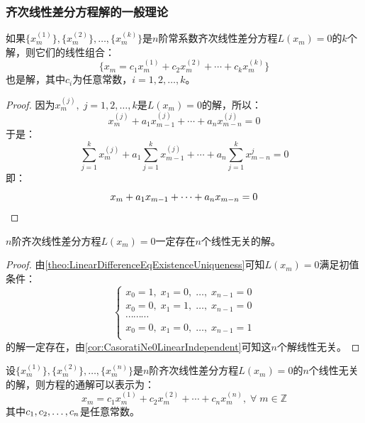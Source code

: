 \subsubsection{齐次线性差分方程解的一般理论}
\begin{theorem}\label{theo:LinearDifferenceLinearCombination}
	如果$\{x_m^{(1)}\},\{x_m^{(2)}\},\dots,\{x_m^{(k)}\}$是$n$阶常系数齐次线性差分方程$L(x_m)=0$的$k$个解，则它们的线性组合：
	\begin{equation*}
		\{x_m=c_1x_m^{(1)}+c_2x_m^{(2)}+\cdots+c_kx_m^{(k)}\}
	\end{equation*}
	也是解，其中$c_i$为任意常数，$i=1,2,\dots,k$。
\end{theorem}
\begin{proof}
	因为$x_m^{(j)},\;j=1,2,\dots,k$是$L(x_m)=0$的解，所以：
	\begin{equation*}
		x_m^{(j)}+a_{1}x_{m-1}^{(j)}+\cdots+a_nx_{m-n}^{(j)}=0
	\end{equation*}
	于是：
	\begin{equation*}
		\sum_{j=1}^{k}x_m^{(j)}+a_1\sum_{j=1}^{k}x_{m-1}^{(j)}+\cdots+a_n\sum_{j=1}^{k}x_{m-n}^{j}=0
	\end{equation*}
	即：
	\begin{equation*}
		x_m+a_{1}x_{m-1}+\cdots+a_nx_{m-n}=0\qedhere
	\end{equation*}
\end{proof}
\begin{theorem}
	$n$阶齐次线性差分方程$L(x_m)=0$一定存在$n$个线性无关的解。
\end{theorem}
\begin{proof}
	由\cref{theo:LinearDifferenceEqExistenceUniqueness}可知$L(x_m)=0$满足初值条件：
	\begin{equation*}
		\begin{cases}
			x_0=1,\;x_1=0,\;\dots,\;x_{n-1}=0 \\
			x_0=0,\;x_1=1,\;\dots,\;x_{n-1}=0 \\
			\cdots\cdots\cdots \\
			x_0=0,\;x_1=0,\;\dots,\;x_{n-1}=1 \\
		\end{cases}
	\end{equation*}
	的解一定存在，由\cref{cor:CasoratiNe0LinearIndependent}可知这$n$个解线性无关。
\end{proof}
\begin{theorem}\label{theo:GeneralSolutionHomogeneousLinearDifferenceEquation}
	设$\{x_m^{(1)}\},\{x_m^{(2)}\},\dots,\{x_m^{(n)}\}$是$n$阶齐次线性差分方程$L(x_m)=0$的$n$个线性无关的解，则方程的通解可以表示为：
	\begin{equation*}
		x_m=c_1x_m^{(1)}+c_2x_m^{(2)}+\cdots+c_nx_m^{(n)},\;\forall\;m\in\mathbb{Z}
	\end{equation*}
	其中$c_1, c_2, \dots, c_{n}$是任意常数。
\end{theorem}
